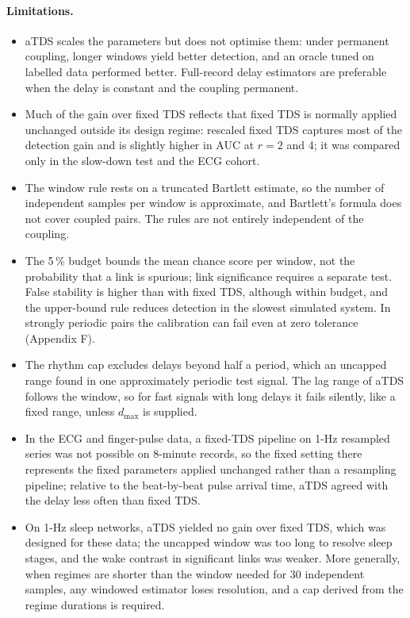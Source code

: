 \documentclass[11pt,a4paper]{article}
\begin{document}
\paragraph{Limitations.}
\begin{itemize}
\setlength{\itemsep}{1pt}
\item aTDS scales the parameters but does not optimise them: under permanent coupling, longer windows yield better detection, and an oracle tuned on labelled data performed better. Full-record delay estimators are preferable when the delay is constant and the coupling permanent.
\item Much of the gain over fixed TDS reflects that fixed TDS is normally applied unchanged outside its design regime: rescaled fixed TDS captures most of the detection gain and is slightly higher in AUC at $r = 2$ and 4; it was compared only in the slow-down test and the ECG cohort.
\item The window rule rests on a truncated Bartlett estimate, so the number of independent samples per window is approximate, and Bartlett's formula does not cover coupled pairs. The rules are not entirely independent of the coupling.
\item The 5\,\% budget bounds the mean chance score per window, not the probability that a link is spurious; link significance requires a separate test. False stability is higher than with fixed TDS, although within budget, and the upper-bound rule reduces detection in the slowest simulated system. In strongly periodic pairs the calibration can fail even at zero tolerance (Appendix F).
\item The rhythm cap excludes delays beyond half a period, which an uncapped range found in one approximately periodic test signal. The lag range of aTDS follows the window, so for fast signals with long delays it fails silently, like a fixed range, unless $d_{\max}$ is supplied.
\item In the ECG and finger-pulse data, a fixed-TDS pipeline on 1-Hz resampled series was not possible on 8-minute records, so the fixed setting there represents the fixed parameters applied unchanged rather than a resampling pipeline; relative to the beat-by-beat pulse arrival time, aTDS agreed with the delay less often than fixed TDS.
\item On 1-Hz sleep networks, aTDS yielded no gain over fixed TDS, which was designed for these data; the uncapped window was too long to resolve sleep stages, and the wake contrast in significant links was weaker. More generally, when regimes are shorter than the window needed for 30 independent samples, any windowed estimator loses resolution, and a cap derived from the regime durations is required.

\end{itemize}
\end{document}
